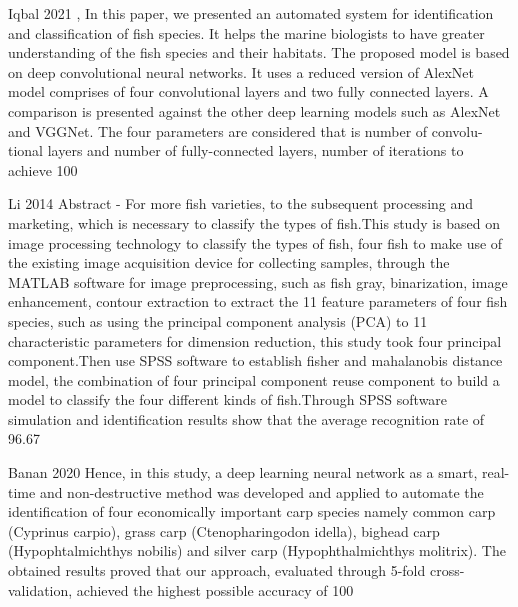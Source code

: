 Iqbal 2021 \cite{Iqbal2021AutomaticFS},
In this paper, we presented an automated system for identification and classification of fish species. It helps the marine biologists to have greater understanding of the fish species and their habitats. The proposed model is based on deep convolutional neural networks. It uses a reduced version of AlexNet model comprises of four convolutional layers and two fully connected layers. A comparison is presented against the other deep learning models such as AlexNet and VGGNet. The four parameters are considered that is number of convolu- tional layers and number of fully-connected layers, number of iterations to achieve 100%

Li 2014 \cite{Li2014IdentificationOF}
Abstract - For more fish varieties, to the subsequent processing and marketing, which is necessary to classify the types of fish.This study is based on image processing technology to classify the types of fish, four fish to make use of the existing image acquisition device for collecting samples, through the MATLAB software for image preprocessing, such as fish gray, binarization, image enhancement, contour extraction to extract the 11 feature parameters of four fish species, such as using the principal component analysis (PCA) to 11 characteristic parameters for dimension reduction, this study took four principal component.Then use SPSS software to establish fisher and mahalanobis distance model, the combination of four principal component reuse component to build a model to classify the four different kinds of fish.Through SPSS software simulation and identification results show that the average recognition rate of 96.67%


Banan 2020 \cite{Banan2020DeepLA}
Hence, in this study, a deep learning neural network as a smart, real-time and non-destructive method was developed and applied to automate the identification of four economically important carp species namely common carp (Cyprinus carpio), grass carp (Ctenopharingodon idella), bighead carp (Hypophtalmichthys nobilis) and silver carp (Hypophthalmichthys molitrix). The obtained results proved that our approach, evaluated through 5-fold cross-validation, achieved the highest possible accuracy of 100 %

